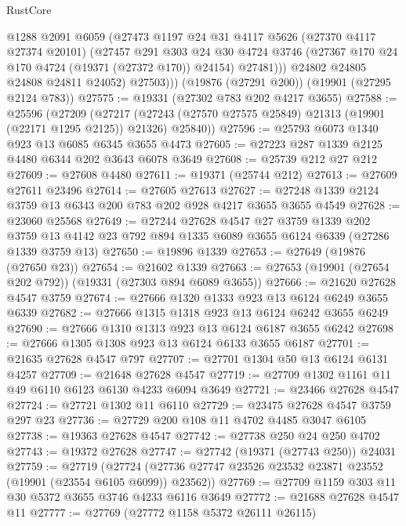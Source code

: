 \begin{lexlean}{RustCore}
\begin{coremodule}
              @1288
              @2091
              @6059
              (@27473
                @1197
                @24
                @31
                @4117
                @5626
                (@27370 @4117 @27374 @20101)
                (@27457
                  @291
                  @303
                  @24
                  @30
                  @4724
                  @3746
                  (@27367 @170 @24 @170 @4724 (@19371 (@27372 @170)) @24154)
                  @27481)))
            @24802
            @24805
            @24808
            @24811
            @24052)
          @27503)))
    (@19876 (@27291 @200))
    (@19901 (@27295 @2124 @783))
@27575 := @19331 (@27302 @783 @202 @4217 @3655)
@27588 := @25596
    (@27209
      (@27217 (@27243 (@27570 @27575 @25849) @21313 (@19901 (@22171 @1295 @2125)) @21326) @25840))
@27596 := @25793 @6073 @1340 @923 @13 @6085 @6345 @3655 @4473
@27605 := @27223 @287 @1339 @2125 @4480 @6344 @202 @3643 @6078 @3649
@27608 := @25739 @212 @27 @212
@27609 := @27608 @4480
@27611 := @19371 (@25744 @212)
@27613 := @27609 @27611 @23496
@27614 := @27605 @27613
@27627 := @27248 @1339 @2124 @3759 @13 @6343 @200 @783 @202 @928 @4217 @3655 @3655 @4549
@27628 := @23060 @25568
@27649 := @27244
    @27628
    @4547
    @27
    @3759
    @1339
    @202
    @3759
    @13
    @4142
    @23
    @792
    @894
    @1335
    @6089
    @3655
    @6124
    @6339
    (@27286 @1339 @3759 @13)
@27650 := @19896 @1339
@27653 := @27649 (@19876 (@27650 @23))
@27654 := @21602 @1339
@27663 := @27653 (@19901 (@27654 @202 @792)) (@19331 (@27303 @894 @6089 @3655))
@27666 := @21620 @27628 @4547 @3759
@27674 := @27666 @1320 @1333 @923 @13 @6124 @6249 @3655 @6339
@27682 := @27666 @1315 @1318 @923 @13 @6124 @6242 @3655 @6249
@27690 := @27666 @1310 @1313 @923 @13 @6124 @6187 @3655 @6242
@27698 := @27666 @1305 @1308 @923 @13 @6124 @6133 @3655 @6187
@27701 := @21635 @27628 @4547 @797
@27707 := @27701 @1304 @50 @13 @6124 @6131 @4257
@27709 := @21648 @27628 @4547
@27719 := @27709 @1302 @1161 @11 @49 @6110 @6123 @6130 @4233 @6094 @3649
@27721 := @23466 @27628 @4547
@27724 := @27721 @1302 @11 @6110
@27729 := @23475 @27628 @4547 @3759 @297 @23
@27736 := @27729 @200 @108 @11 @4702 @4485 @3047 @6105
@27738 := @19363 @27628 @4547
@27742 := @27738 @250 @24 @250 @4702
@27743 := @19372 @27628
@27747 := @27742 (@19371 (@27743 @250)) @24031
@27759 := @27719
    (@27724 (@27736 @27747 @23526 @23532 @23871 @23552 (@19901 (@23554 @6105 @6099)) @23562))
@27769 := @27709 @1159 @303 @11 @30 @5372 @3655 @3746 @4233 @6116 @3649
@27772 := @21688 @27628 @4547 @11
@27777 := @27769 (@27772 @1158 @5372 @26111 @26115)

\end{coremodule}
\end{lexlean}
